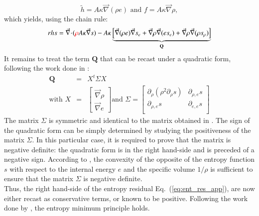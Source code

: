 \documentclass[preprint,10pt]{elsarticle}
\renewcommand{\div}{\vec{\nabla}\! \cdot \!}
\newcommand{\grad}{\vec{\nabla}}
\newcommand{\eqt}[1]{Eq.~(\ref{#1})}                     %
\newcommand{\tcr}[1]{\textcolor{red}{#1}}
\begin{document}
\begin{equation}
\tilde{h} = A \kappa \grad ( \rho e ) \text{ and } f = A \kappa \grad \rho, \nonumber 
\end{equation}
which yields, using the chain rule:
\begin{equation}
rhs = \div (\tcr{\rho} A \kappa \grad s ) - A \kappa \underbrace{\left[ \grad (\rho e) \grad s_e  + \grad \rho \grad (e s_e) +  \grad \rho \grad ( \rho s_{\rho} )  \right]}_{\mathbf{Q}} \nonumber
\end{equation}
It remains to treat the term $\mathbf{Q}$ that can be recast under a quadratic form, following the work done in \cite{jlg}:
\begin{eqnarray}
\mathbf{Q} &=& X^t \Sigma X \nonumber \\
\text{with } X &=& \begin{bmatrix}
\grad \rho \\
\grad e 
\end{bmatrix}
\text{and } \Sigma = \begin{bmatrix}
       \partial_{\rho} (\rho^2 \partial_{\rho} s) & \partial_{\rho,e} s  \\[0.3em]
       \partial_{\rho,e} s & \partial_{e,e} s           \\[0.3em]
     \end{bmatrix} \nonumber 
\end{eqnarray}
The matrix $\Sigma$ is symmetric and identical to the matrix obtained in \cite{jlg}. The sign of the quadratic form can be simply determined by studying the positiveness of the matrix $\Sigma$. In this particular case, it is required to prove that the matrix is negative definite: the quadratic form is in the right hand-side and is preceded of a negative sign. According to \cite{jlg}, the convexity of the opposite of the entropy function $s$ with respect to the internal energy $e$ and the specific volume $1/ \rho$ is sufficient to ensure that the matrix $\Sigma$ is negative definite. \\
Thus, the right hand-side of the entropy residual \eqt{eq:ent_res_app}, are now either recast as conservative terms, or known to be positive. Following the work done by \cite{jlg}, the entropy minimum principle holds.
\newpage
\end{document}
